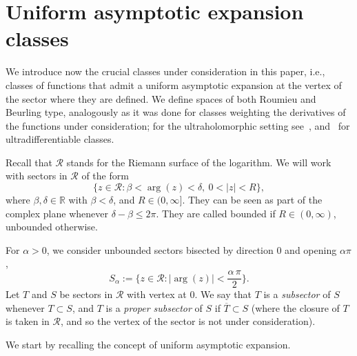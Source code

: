 \documentclass[11pt,a4paper]{article}
\theoremstyle{plain}
\theoremstyle{definition}
\newcommand{\RR}{\mathbb{R}}
\newcommand{\CC}{\mathbb{C}}
\def\a{\alpha}
\def\ga{\gamma}
\begin{document}
\section{Uniform asymptotic expansion classes}\label{sect.AsymptoticexpClass}

We introduce now the crucial classes under consideration in this paper, i.e., classes of functions that admit a uniform asymptotic expansion at the vertex of the sector where they are defined. We define spaces of both Roumieu and Beurling type, analogously as it was done for classes weighting the derivatives of the functions under consideration; for the ultraholomorphic setting see~\cite{ultraholomstab}, and~\cite{compositionpaper} for ultradifferentiable classes.


Recall that $\mathcal{R}$ stands for the Riemann surface of the logarithm. 
We will work with sectors in $\mathcal{R}$ of the form
$$
\{z\in\mathcal{R}\colon \beta<\arg(z)<\delta,\ 0<|z|<R\},
$$
where $\beta,\delta\in\RR$ with $\beta<\delta$, and $R\in(0,\infty]$. They can be seen as part of the complex plane whenever $\delta-\beta\le 2\pi$. They are called bounded if $R\in(0,\infty)$, unbounded otherwise.

For $\a>0$, we consider unbounded sectors bisected by direction 0 and opening $\a\pi$,
$$S_{\a}:=\{z\in\mathcal{R}:|\arg(z)|<\frac{\a\,\pi}{2}\}.$$
%
Let $T$ and $S$ be sectors in $\mathcal{R}$ with vertex at $0$. We say that $T$ is a \emph{subsector} of $S$ whenever $T\subset S$, and $T$ is a \emph{proper subsector} of  $S$ if $\overline{T}\subset S$ (where the closure of $T$ is taken in $\mathcal{R}$, and so the vertex of the sector is not under consideration).

%
%

We start by recalling the concept of uniform asymptotic expansion.
\end{document}
